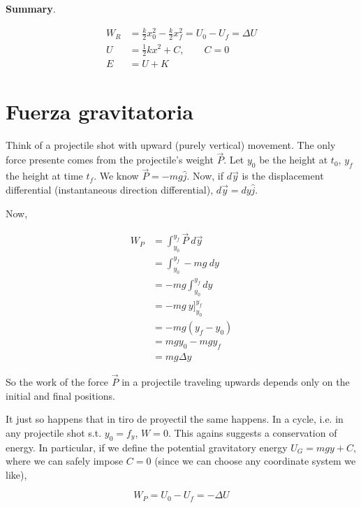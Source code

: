 \documentclass[12pt]{article}
\theoremstyle{definition}
\begin{document}
\begin{shaded}
    \textbf{Summary}. 

    \begin{align}
        W_R &= \frac{k}{2}x_0^2 - \frac{k}{2} x_f^2 = U_0 - U_f = \Delta U\\ 
        U &= \frac{1}{2} k x^2 + C, \qquad C = 0 \\ 
        E &= U + K
    \end{align}
\end{shaded}


\section{Fuerza gravitatoria}

Think of a projectile shot with upward (purely vertical) movement. The only
force presente comes from the projectile's weight $\vec{P}$. Let $y_0$ be the
height at $t_0$, $y_f$ the height at time $t_f$. We know $\vec{P} = -mg
\hat{j}$. Now, if $d\vec{y}$ is the displacement differential (instantaneous
direction differential), $d\vec{y} = dy \hat{j}$.

Now, 

\begin{align*}
    W_P 
    &= \int_{y_0}^{y_f} \vec{P} ~ d \vec{y} \\ 
    &= \int_{y_0}^{y_f} -mg ~ dy \\ 
    &= -mg \int_{y_0}^{y_f} dy \\ 
    &= -mg ~ y\Big]_{y_0}^{y_f} \\ 
    &= -mg \left( y_f - y_0 \right)  \\ 
    &= mgy_0 - mgy_f \\ 
    &= mg \Delta y
\end{align*}

So the work of the force $\vec{P}$ in a projectile traveling upwards depends
only on the initial and final positions.

It just so happens that in tiro de proyectil the same happens. In a cycle, i.e.
in any projectile shot s.t. $y_0 = f_y$, $W = 0$. This agains suggests a
conservation of energy. In particular, if we define the potential gravitatory
energy $U_G = mg y + C$, where we can safely impose $C = 0$ (since we can choose
any coordinate system we like), 

\begin{equation*}
    W_P = U_0 - U_f = -\Delta U
\end{equation*}
\end{document}
